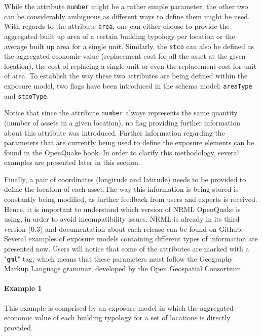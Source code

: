 While the attribute \Verb+number+ might be a rather simple parameter, the other two can be considerably ambiguous as different ways to define them might be used. With regards to the attribute \Verb+area+, one can either choose to provide the aggregated built up area of a certain building typology per location or the average built up area for a single unit. Similarly, the \Verb+stco+ can also be defined as the aggregated economic value (replacement cost for all the asset at the given location), the cost of replacing a single unit or even the replacement cost for unit of area. To establish the way these two attributes are being defined within the exposure model, two flags have been introduced in the schema model:  \Verb+areaType+ and \Verb+stcoType+. 

Notice that since the attribute \Verb+number+ always represents the same quantity (number of assets in a given location), no flag providing further information about this attribute was introduced. Further information regarding the parameters that are currently being used to define the exposure elements can be found in the OpenQuake book. In order to clarify this methodology, several examples are presented later in this section.

Finally, a pair of coordinates (longitude and latitude) needs to be provided to define the location of each asset.The way this information is being stored is constantly being modified, as further feedback from users and experts is received. Hence, it is important to understand which version of NRML OpenQuake is using, in order to avoid incompatibility issues. NRML is already in its third version (0.3) and documentation about each release can be found on Github. Several examples of exposure models containing different types of information are presented now. Users will notice that some of the attributes are marked with a "\Verb+gml+" tag, which means that these parameters must follow the Geography Markup Language grammar, developed by the Open Geospatial Consortium.\\

\paragraph{Example 1}
This example is comprised by an exposure model in which the aggregated economic value of each building typology for a set of locations is directly provided.

